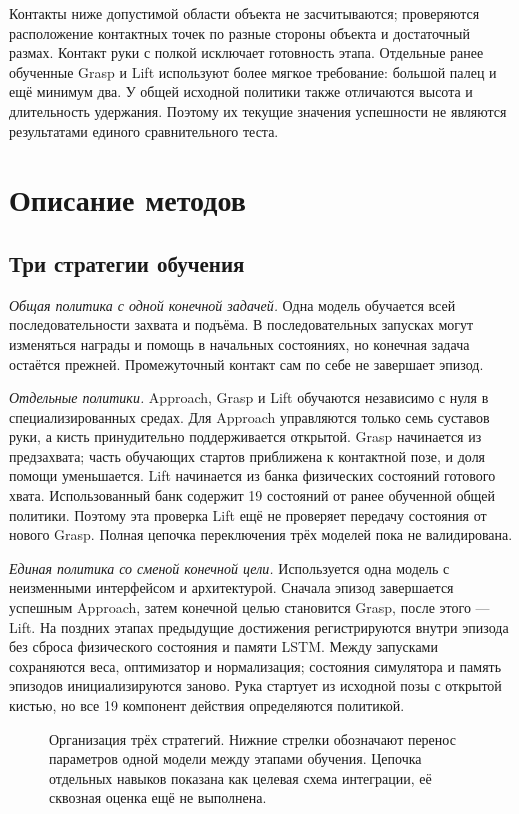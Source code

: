 \documentclass{misisarticle}
\begin{document}
Контакты ниже допустимой области объекта не засчитываются; проверяются расположение контактных точек по разные стороны объекта и достаточный размах. Контакт руки с полкой исключает готовность этапа. Отдельные ранее обученные Grasp и Lift используют более мягкое требование: большой палец и ещё минимум два. У общей исходной политики также отличаются высота и длительность удержания. Поэтому их текущие значения успешности не являются результатами единого сравнительного теста.

\section{Описание методов}
\subsection{Три стратегии обучения}
\textit{Общая политика с одной конечной задачей.} Одна модель обучается всей последовательности захвата и подъёма. В последовательных запусках могут изменяться награды и помощь в начальных состояниях, но конечная задача остаётся прежней. Промежуточный контакт сам по себе не завершает эпизод.

\textit{Отдельные политики.} Approach, Grasp и Lift обучаются независимо с нуля в специализированных средах. Для Approach управляются только семь суставов руки, а кисть принудительно поддерживается открытой. Grasp начинается из предзахвата; часть обучающих стартов приближена к контактной позе, и доля помощи уменьшается. Lift начинается из банка физических состояний готового хвата. Использованный банк содержит 19 состояний от ранее обученной общей политики. Поэтому эта проверка Lift ещё не проверяет передачу состояния от нового Grasp. Полная цепочка переключения трёх моделей пока не валидирована.

\textit{Единая политика со сменой конечной цели.} Используется одна модель с неизменными интерфейсом и архитектурой. Сначала эпизод завершается успешным Approach, затем конечной целью становится Grasp, после этого --- Lift. На поздних этапах предыдущие достижения регистрируются внутри эпизода без сброса физического состояния и памяти LSTM. Между запусками сохраняются веса, оптимизатор и нормализация; состояния симулятора и память эпизодов инициализируются заново. Рука стартует из исходной позы с открытой кистью, но все 19 компонент действия определяются политикой.

\begin{figure}[tb]
\centering

\caption{Организация трёх стратегий. Нижние стрелки обозначают перенос параметров одной модели между этапами обучения. Цепочка отдельных навыков показана как целевая схема интеграции, её сквозная оценка ещё не выполнена.}
\label{fig:strategies}
\end{figure}
\end{document}
